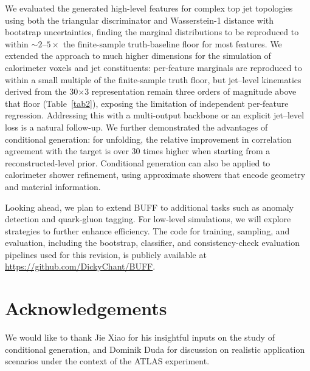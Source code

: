 \documentclass[%
 reprint,
 amsmath,amssymb,
 aps,
prd,
floatfix,
]{revtex4-2}
\begin{document}
We evaluated the generated high-level features for complex top jet topologies using both the triangular discriminator and Wasserstein-1 distance with bootstrap uncertainties, finding the marginal distributions to be reproduced to within $\sim\!2$--$5\times$ the finite-sample truth-baseline floor for most features. We extended the approach to much higher dimensions for the simulation of calorimeter voxels and jet constituents: per-feature marginals are reproduced to within a small multiple of the finite-sample truth floor, but jet--level kinematics derived from the 30$\times$3 representation remain three orders of magnitude above that floor (Table~\ref{tab2}), exposing the limitation of independent per-feature regression. Addressing this with a multi-output backbone or an explicit jet--level loss is a natural follow-up. We further demonstrated the advantages of conditional generation: for unfolding, the relative improvement in correlation agreement with the target is over 30 times higher when starting from a reconstructed-level prior. Conditional generation can also be applied to calorimeter shower refinement, using approximate showers that encode geometry and material information.

Looking ahead, we plan to extend BUFF to additional tasks such as anomaly detection and quark-gluon tagging. For low-level simulations, we will explore strategies to further enhance efficiency. The code for training, sampling, and evaluation, including the bootstrap, classifier, and consistency-check evaluation pipelines used for this revision, is publicly available at \url{https://github.com/DickyChant/BUFF}.

\section{Acknowledgements}

We would like to thank Jie Xiao for his insightful inputs on the study of conditional generation, and Dominik Duda for discussion on realistic application scenarios under the context of the ATLAS experiment.%
\end{document}
